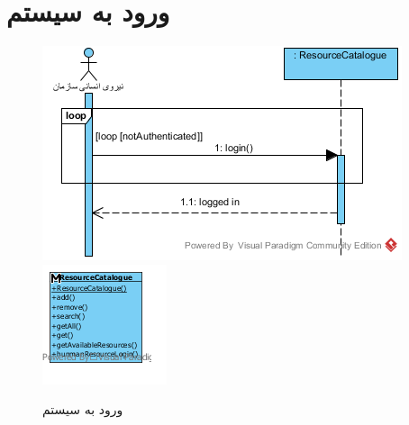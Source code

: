 \section{ورود به سیستم}
\begin{figure}[H]
	\centering
	\includegraphics[scale=0.8]{img/sequence-analysis/SignIn}
	\includegraphics[scale=0.8]{img/sequence-analysis/SignInC}
	\caption{ورود به سیستم}
\end{figure}

